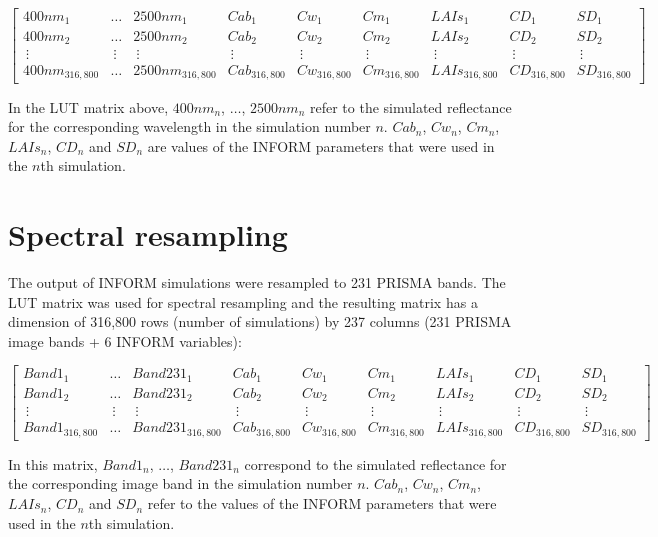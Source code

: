 \documentclass[a4paper, twoside]{templates/ociamthesis}
\begin{document}
\begingroup
\tiny

\[
\begin{bmatrix}
400nm_{1} & \dots & 2500nm_{1} & Cab_{1} & Cw_{1} & Cm_{1} & LAIs_{1} & CD_{1} & SD_{1}\\
400nm_{2} & \dots & 2500nm_{2} & Cab_{2} & Cw_{2} & Cm_{2} & LAIs_{2} & CD_{2} & SD_{2}\\
\ \vdots  &\ \vdots &\ \vdots &\ \vdots &\ \vdots &\ \vdots &\ \vdots &\ \vdots &\ \vdots\\
400nm_{316,800} & \dots & 2500nm_{316,800} & Cab_{316,800} & Cw_{316,800} & Cm_{316,800} & LAIs_{316,800} & CD_{316,800} & SD_{316,800}
\end{bmatrix}
\]
\endgroup

In the LUT matrix above, \(400nm_{n}\), \(\dots\), \(2500nm_{n}\) refer to the simulated reflectance for the corresponding wavelength in the simulation number \(n\). \(Cab_{n}\), \(Cw_{n}\), \(Cm_{n}\), \(LAIs_{n}\), \(CD_{n}\) and \(SD_{n}\) are values of the INFORM parameters that were used in the \(n\)th simulation.

\hypertarget{spectral-resampling-1}{%
\section{Spectral resampling}\label{spectral-resampling-1}}

The output of INFORM simulations were resampled to 231 PRISMA bands. The LUT matrix was used for spectral resampling and the resulting matrix has a dimension of 316,800 rows (number of simulations) by 237 columns (231 PRISMA image bands + 6 INFORM variables):

\begingroup
\tiny

\[
\begin{bmatrix}
Band1_{1} & \dots & Band231_{1} & Cab_{1} & Cw_{1} & Cm_{1} & LAIs_{1} & CD_{1} & SD_{1}\\
Band1_{2} & \dots & Band231_{2} & Cab_{2} & Cw_{2} & Cm_{2} & LAIs_{2} & CD_{2} & SD_{2}\\
\ \vdots  &\ \vdots &\ \vdots &\ \vdots &\ \vdots &\ \vdots &\ \vdots &\ \vdots &\ \vdots\\
Band1_{316,800} & \dots & Band231_{316,800} & Cab_{316,800} & Cw_{316,800} & Cm_{316,800} & LAIs_{316,800} & CD_{316,800} & SD_{316,800}
\end{bmatrix}
\]
\endgroup

In this matrix, \(Band1_{n}\), \(\dots\), \(Band231_{n}\) correspond to the simulated reflectance for the corresponding image band in the simulation number \(n\). \(Cab_{n}\), \(Cw_{n}\), \(Cm_{n}\), \(LAIs_{n}\), \(CD_{n}\) and \(SD_{n}\) refer to the values of the INFORM parameters that were used in the \(n\)th simulation.
\end{document}
